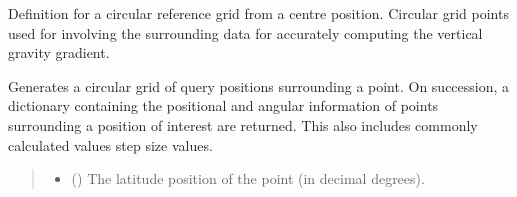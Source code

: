 \documentclass[letterpaper,10pt,english]{sphinxmanual}
\begin{document}
\begin{fulllineitems}
\label{\detokenize{modules/gravity/map:qnav.gravity.map.CircularGrid}}
\pysigstartsignatures
{}
\pysigstopsignatures
\sphinxAtStartPar
Definition for a circular reference grid from a centre position.
Circular grid points used for involving the surrounding data for
accurately computing the vertical gravity gradient.

\begin{fulllineitems}
\label{\detokenize{modules/gravity/map:qnav.gravity.map.CircularGrid.generate_grid}}
\pysigstartsignatures
{}
\pysigstopsignatures
\sphinxAtStartPar
Generates a circular grid of query positions surrounding a point.
On succession, a dictionary containing the positional and
angular information of points surrounding a position of interest are
returned. This also includes commonly calculated values step size
values.
\begin{quote}\begin{description}
\begin{itemize}
\item {} 
\sphinxAtStartPar
{} () \textendash{} The latitude position of the point (in decimal degrees).


\end{itemize}
\end{description}
\end{quote}
\end{fulllineitems}
\end{fulllineitems}
\end{document}
